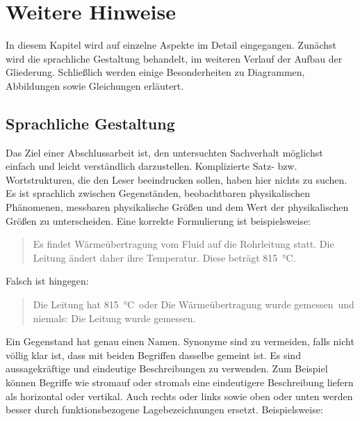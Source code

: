 \cleardoublepage

\chapter{Weitere Hinweise}
\label{CHAPTER:Hinweise}

In diesem Kapitel wird auf einzelne Aspekte im Detail eingegangen. Zunächst wird die sprachliche Gestaltung behandelt, im weiteren Verlauf der Aufbau der Gliederung. Schließlich werden einige Besonderheiten zu Diagrammen, Abbildungen sowie Gleichungen erläutert.
\section{Sprachliche Gestaltung}
\label{SECTION:Sprache}

Das Ziel einer Abschlussarbeit ist, den untersuchten Sachverhalt möglichst einfach und leicht verständlich darzustellen. Komplizierte Satz- bzw. Wortstrukturen, die den Leser beeindrucken sollen, haben hier nichts zu suchen. Es ist sprachlich zwischen Gegenständen, beobachtbaren physikalischen Phänomenen, messbaren physikalische Größen und dem Wert der physikalischen Größen zu unterscheiden. Eine korrekte Formulierung ist beispielsweise: 
\begin{quote}
	\glqq Es findet Wärmeübertragung vom Fluid auf die Rohrleitung statt. Die Leitung ändert daher ihre Temperatur. Diese beträgt \SI{815}{\celsius}\grqq.
\end{quote}

Falsch ist hingegen: 

\begin{quote}
	\glqq Die Leitung hat \SI{815}{\celsius}\grqq~oder \glqq Die Wärmeübertragung wurde gemessen\grqq~und niemals: \glqq Die Leitung wurde gemessen\grqq.
\end{quote}

Ein Gegenstand hat genau einen Namen. Synonyme sind zu vermeiden, falls nicht völlig klar ist, dass mit beiden Begriffen dasselbe gemeint ist. Es sind aussagekräftige und eindeutige Beschreibungen zu verwenden. Zum Beispiel können Begriffe wie stromauf oder stromab eine eindeutigere Beschreibung liefern als horizontal oder vertikal. Auch rechts oder links sowie oben oder unten werden besser durch funktionsbezogene Lagebezeichnungen ersetzt. Beispielsweise: 

